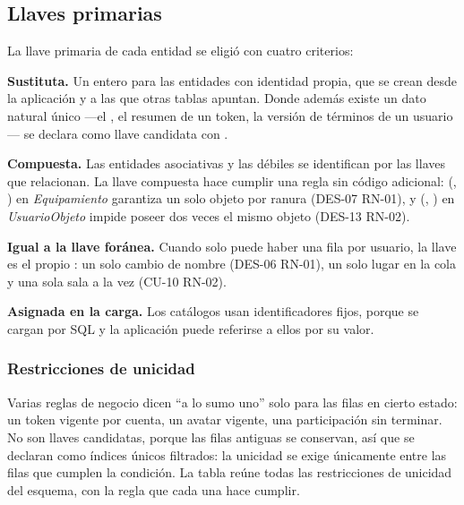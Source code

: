 \subsection*{Llaves primarias}

La llave primaria de cada entidad se eligió con cuatro criterios:

\begin{reglas}
  \item \textbf{Sustituta.} Un entero  para las entidades con identidad propia, que se crean desde la aplicación y a las que otras tablas apuntan. Donde además existe un dato natural único —el , el resumen de un token, la versión de términos de un usuario— se declara como llave candidata con .
  \item \textbf{Compuesta.} Las entidades asociativas y las débiles se identifican por las llaves que relacionan. La llave compuesta hace cumplir una regla sin código adicional: (, ) en \textit{Equipamiento} garantiza un solo objeto por ranura (\mbox{DES-07} \mbox{RN-01}), y (, ) en \textit{UsuarioObjeto} impide poseer dos veces el mismo objeto (\mbox{DES-13} \mbox{RN-02}).
  \item \textbf{Igual a la llave foránea.} Cuando solo puede haber una fila por usuario, la llave es el propio : un solo cambio de nombre (\mbox{DES-06} \mbox{RN-01}), un solo lugar en la cola y una sola sala a la vez (\mbox{CU-10} \mbox{RN-02}).
  \item \textbf{Asignada en la carga.} Los catálogos usan identificadores fijos, porque se cargan por SQL y la aplicación puede referirse a ellos por su valor.
\end{reglas}



\subsubsection*{Restricciones de unicidad}

Varias reglas de negocio dicen ``a lo sumo uno'' solo para las filas en cierto estado: un token vigente por cuenta, un avatar vigente, una participación sin terminar. No son llaves candidatas, porque las filas antiguas se conservan, así que se declaran como índices únicos filtrados: la unicidad se exige únicamente entre las filas que cumplen la condición. La tabla reúne todas las restricciones de unicidad del esquema, con la regla que cada una hace cumplir.


